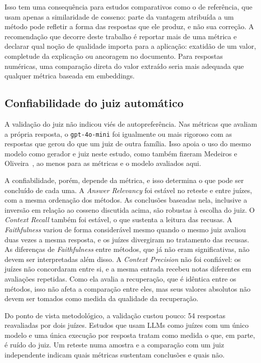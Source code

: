 Isso tem uma consequência para estudos comparativos como o de referência, que usam apenas a similaridade de cosseno: parte da vantagem atribuída a um método pode refletir a forma das respostas que ele produz, e não sua correção. A recomendação que decorre deste trabalho é reportar mais de uma métrica e declarar qual noção de qualidade importa para a aplicação: exatidão de um valor, completude da explicação ou ancoragem no documento. Para respostas numéricas, uma comparação direta do valor extraído seria mais adequada que qualquer métrica baseada em embeddings.

\subsection{Confiabilidade do juiz automático}
\label{ssc:disc_juiz}

A validação do juiz não indicou viés de autopreferência. Nas métricas que avaliam a própria resposta, o \texttt{gpt-4o-mini} foi igualmente ou mais rigoroso com as respostas que gerou do que um juiz de outra família. Isso apoia o uso do mesmo modelo como gerador e juiz neste estudo, como também fizeram Medeiros e Oliveira~\cite{medeiros2025embeddings}, ao menos para as métricas e o modelo avaliados aqui.

A confiabilidade, porém, depende da métrica, e isso determina o que pode ser concluído de cada uma. A \emph{Answer Relevancy} foi estável no reteste e entre juízes, com a mesma ordenação dos métodos. As conclusões baseadas nela, inclusive a inversão em relação ao cosseno discutida acima, são robustas à escolha do juiz. O \emph{Context Recall} também foi estável, o que sustenta a leitura das recusas. A \emph{Faithfulness} variou de forma considerável mesmo quando o mesmo juiz avaliou duas vezes a mesma resposta, e os juízes divergiram no tratamento das recusas. As diferenças de \emph{Faithfulness} entre métodos, que já não eram significativas, não devem ser interpretadas além disso. A \emph{Context Precision} não foi confiável: os juízes não concordaram entre si, e a mesma entrada recebeu notas diferentes em avaliações repetidas. Como ela avalia a recuperação, que é idêntica entre os métodos, isso não afeta a comparação entre eles, mas seus valores absolutos não devem ser tomados como medida da qualidade da recuperação.

Do ponto de vista metodológico, a validação custou pouco: 54 respostas reavaliadas por dois juízes. Estudos que usam LLMs como juízes com um único modelo e uma única execução por resposta tratam como medida o que, em parte, é ruído do juiz. Um reteste numa amostra e a comparação com um juiz independente indicam quais métricas sustentam conclusões e quais não.


